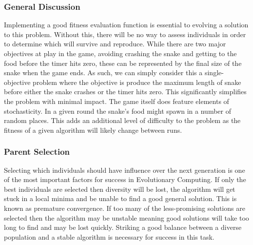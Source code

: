 \documentclass{article}
\begin{document}
\subsubsection{General Discussion}
Implementing a good fitness evaluation function is essential to evolving a solution to this problem. Without this, there will be no way to assess individuals in order to determine which will survive and reproduce. While there are two major objectives at play in the game, avoiding crashing the snake and getting to the food before the timer hits zero, these can be represented by the final size of the snake when the game ends. As such, we can simply consider this a single-objective problem where the objective is produce the maximum length of snake before either the snake crashes or the timer hits zero. This significantly simplifies the problem with minimal impact. The game itself does feature elements of stochasticity. In a given round the snake's food might spawn in a number of random places. This adds an additional level of difficulty to the problem as the fitness of a given algorithm will likely change between runs.




\subsubsection{Parent Selection}
Selecting which individuals should have influence over the next generation is one of the most important factors for success in Evolutionary Computing. If only the best individuals are selected then diversity will be lost, the algorithm will get stuck in a local minima and be unable to find a good general solution. This is known as premature convergence. If too many of the less-promising solutions are selected then the algorithm may be unstable meaning good solutions will take too long to find and may be lost quickly. Striking a good balance between a diverse population and a stable algorithm is necessary for success in this task.
\end{document}
